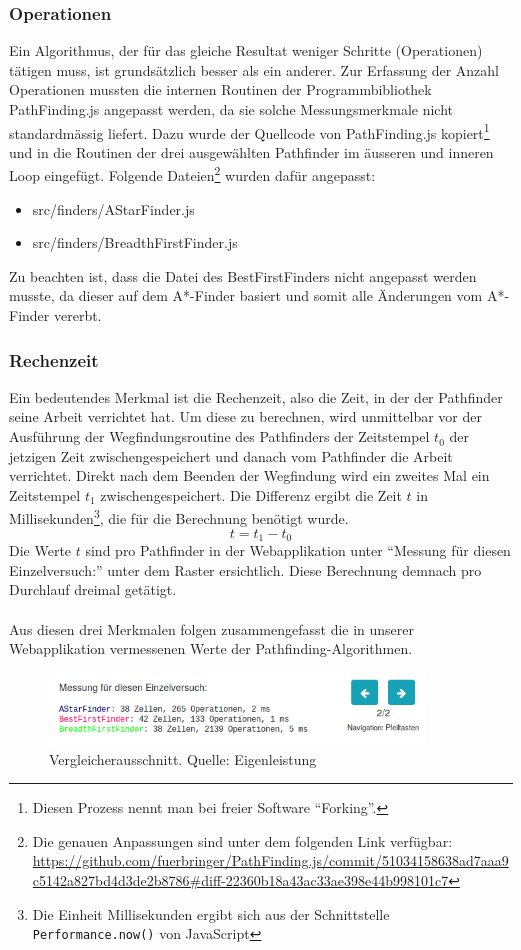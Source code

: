 \documentclass[12pt,a4paper,german]{report}
\begin{document}
\subsubsection{Operationen}
Ein Algorithmus, der für das gleiche Resultat weniger Schritte (Operationen) tätigen muss, ist grundsätzlich besser als ein anderer. Zur Erfassung der Anzahl Operationen mussten die internen Routinen der Programmbibliothek PathFinding.js angepasst werden, da sie solche Messungsmerkmale nicht standardmässig liefert. Dazu wurde der Quellcode von PathFinding.js kopiert\footnote{Diesen Prozess nennt man bei freier Software ``Forking''.} und in die Routinen der drei ausgewählten Pathfinder im äusseren und inneren Loop eingefügt. Folgende Dateien\footnote{Die genauen Anpassungen sind unter dem folgenden Link verfügbar: \url{https://github.com/fuerbringer/PathFinding.js/commit/51034158638ad7aaa9c5142a827bd4d3de2b8786\#diff-22360b18a43ac33ae398e44b998101c7}} wurden dafür angepasst:
\begin{itemize}
\item{src/finders/AStarFinder.js}
\item{src/finders/BreadthFirstFinder.js}
\end{itemize}
Zu beachten ist, dass die Datei des BestFirstFinders nicht angepasst werden musste, da dieser auf dem A*-Finder basiert und somit alle Änderungen vom A*-Finder vererbt.
\subsubsection{Rechenzeit}
Ein bedeutendes Merkmal ist die Rechenzeit, also die Zeit, in der der Pathfinder seine Arbeit verrichtet hat. 
Um diese zu berechnen, wird unmittelbar vor der Ausführung der Wegfindungsroutine des Pathfinders der Zeitstempel $t_0$ der jetzigen Zeit zwischengespeichert und danach vom Pathfinder die Arbeit verrichtet. 
Direkt nach dem Beenden der Wegfindung wird ein zweites Mal ein Zeitstempel $t_1$ zwischengespeichert. Die Differenz ergibt die Zeit $t$ in Millisekunden\footnote{Die Einheit Millisekunden ergibt sich aus der Schnittstelle \texttt{Performance.now()} von JavaScript}, die für die Berechnung benötigt wurde.
\begin{equation}
  t = t_1 - t_0
\end{equation}
Die Werte $t$ sind pro Pathfinder in der Webapplikation unter ``Messung für diesen Einzelversuch:'' unter dem Raster ersichtlich. Diese Berechnung demnach pro Durchlauf dreimal getätigt.
\\\\
Aus diesen drei Merkmalen folgen zusammengefasst die in unserer Webapplikation vermessenen Werte der Pathfinding-Algorithmen.
\begin{figure}[H]
  \centering
  \includegraphics[width=10cm]{measurements_single}
  \caption[Ausschnitt aus dem Pathfinding-Vergleicher für einzelne Vergleiche.]{Vergleicherausschnitt. Quelle: Eigenleistung}
  \label{fig:gui_konzept_comparator}
\end{figure}
\end{document}

